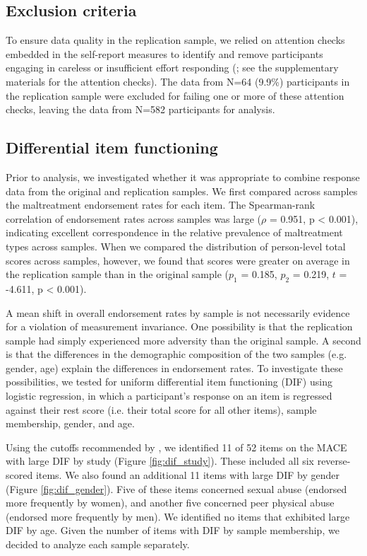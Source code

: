 \documentclass[letterpaper,man,natbib,noextraspace,floatsintext,longtable,12pt]{apa6}
\begin{document}
\subsection{Exclusion criteria}

To ensure data quality in the replication sample, we relied on attention checks embedded in the self-report measures to identify and remove participants engaging in careless or insufficient effort responding (\citealt{zorowitz2021inattentive}; see the supplementary materials for the attention checks). The data from N=64 (9.9\%) participants in the replication sample were excluded for failing one or more of these attention checks, leaving the data from N=582 participants for analysis.

\subsection{Differential item functioning}

Prior to analysis, we investigated whether it was appropriate to combine response data from the original and replication samples. We first compared across samples the maltreatment endorsement rates for each item. The Spearman-rank correlation of endorsement rates across samples was large ($\rho$ = 0.951, p < 0.001), indicating excellent correspondence in the relative prevalence of maltreatment types across samples. When we compared the distribution of person-level total scores across samples, however, we found that scores were greater on average in the replication sample than in the original sample ($p_1$ = 0.185, $p_2$ = 0.219, $t$ = -4.611, p < 0.001). 

A mean shift in overall endorsement rates by sample is not necessarily evidence for a violation of measurement invariance. One possibility is that the replication sample had simply experienced more adversity than the original sample. A second is that the differences in the demographic composition of the two samples (e.g. gender, age) explain the differences in endorsement rates. To investigate these possibilities, we tested for uniform differential item functioning (DIF) using logistic regression, in which a participant's response on an item is regressed against their rest score (i.e. their total score for all other items), sample membership, gender, and age.

Using the cutoffs recommended by \cite{hidalgo2014binary}, we identified 11 of 52 items on the MACE with large DIF by study (Figure \ref{fig:dif_study}). These included all six reverse-scored items. We also found an additional 11 items with large DIF by gender (Figure \ref{fig:dif_gender}). Five of these items concerned sexual abuse (endorsed more frequently by women), and another five concerned peer physical abuse (endorsed more frequently by men). We identified no items that exhibited large DIF by age. Given the number of items with DIF by sample membership, we decided to analyze each sample separately.
\end{document}
